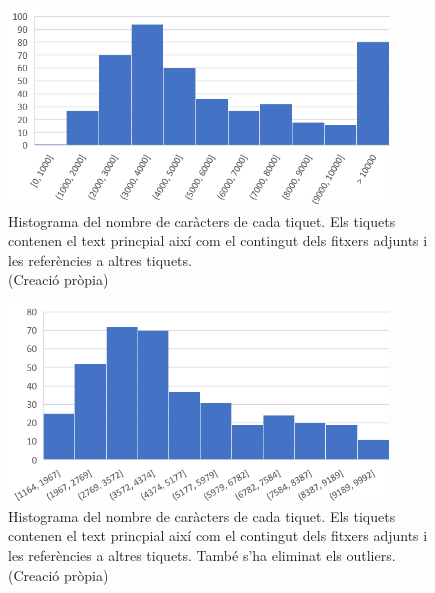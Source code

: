 \begin{figure}[H]
    \centering
    \includegraphics[width=0.9\textwidth]{histograma_num_chars_adj_refs.png}
    \caption[Histograma dels caràcters de cada tiquet amb adjunts i referències]{Histograma del nombre de caràcters de cada tiquet. Els tiquets contenen el text princpial així com el contingut dels fitxers adjunts i les referències a altres tiquets. \\ (Creació pròpia)}
    \label{fig:histograma_num_chars_adj_refs}
\end{figure}

 
\begin{figure}[H]
    \centering
    \includegraphics[width=0.9\textwidth]{histograma_num_chars_adj_refs_outliers.png}
    \caption[Histograma dels caràcters de cada tiquet amb adjunts i referències i sense outliers]{Histograma del nombre de caràcters de cada tiquet. Els tiquets contenen el text princpial així com el contingut dels fitxers adjunts i les referències a altres tiquets. També s'ha eliminat els outliers. \\ (Creació pròpia)}
    \label{fig:histograma_num_chars_adj_refs_outliers}
\end{figure}


